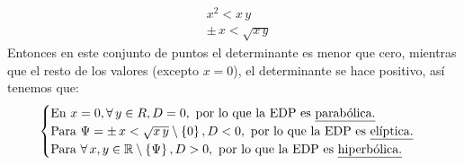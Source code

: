 \begin{enumerate}[label=\alph*)]
\begin{align*}
&x^{2} < x \, y \\[0.5em]
&\pm \, x < \sqrt{x \, y}
\end{align*}
Entonces en este conjunto de puntos el determinante es menor que cero, mientras que el resto de los valores (excepto $x = 0$), el determinante se hace positivo, así tenemos que:
\begin{align*}
\begin{cases}
\mbox{En } x = 0, \forall \, y \in R , D = 0, \mbox{ por lo que la EDP es \underline{parabólica.}} \\
\mbox{Para } \Psi = \pm \, x < \sqrt{x \, y} \setminus \left\{ 0 \right\}, D < 0, \mbox{ por lo que la EDP es \underline{elíptica.}} \\
\mbox{Para } \forall \, x, y \in \mathbb{R} \setminus \left\{ \Psi \right\}, D > 0, \mbox{ por lo que la EDP es \underline{hiperbólica.}}
\end{cases}
\end{align*}
\end{enumerate}
